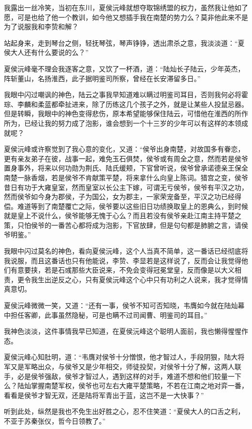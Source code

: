 我露出一丝冷笑，当初在东川，夏侯沅峰就想夺取锦绣盟的权力，虽然我让他如了愿，可是也给了他一个教训，如今他又想插手我在南楚的势力么？莫非他此来不是为了说服我和李贽和解？

站起身来，走到琴台之侧，轻抚琴弦，琴声铮铮，透出肃杀之意，我淡淡道：“夏侯大人还有什么要说的么？”

夏侯沅峰毫不理会我逐客之意，又饮了一杯酒，道：“陆灿长子陆云，少年英杰，阵斩董山，名扬淮西，此子据明鉴司所察，曾经在长安滞留多日。”

我眼中闪过嘲讽的神色，陆云之事我早知道难以瞒过明鉴司耳目，否则我何必将霍琮、李麟和柔蓝都牵扯进来，除了历练这几个孩子之外，就是让某些人投鼠忌器。但是转瞬，我眼中的神色变得悲伤，原本希望能够保住陆云，可惜他在淮西的所作所为，已经让我的努力成了泡影，谁会想到一个十三岁的少年可以有这样的本领成就呢？

夏侯沅峰或许察觉到了我心意的变化，又道：“侯爷出身南楚，对故国多有眷恋，更有亲友弟子在彼，战事一起，难免玉石俱焚，侯爷或有周全之意，然而若是侯爷置身事外，将来以何功勋为荆氏、陆氏缓颊，下官曾听说，侯爷曾承诺德亲王保全南楚一脉香烟，若是侯爷不肯献策平楚，将来拿什么向皇上陈词。猎宫之变，侯爷昔日有功于大雍皇室，然而皇室以长公主下嫁，可谓无亏侯爷，侯爷有平汉之功，然而侯爷如今身为郡侯，子为国公，女为郡主，一家荣宠备至，平汉之功已经得偿。难道等到了南楚覆亡之际，侯爷要以这些旧日功绩换取皇上的恩典么，到时候就是皇上不说什么，侯爷能够无愧于心么？而且若没有侯爷亲赴江南主持平楚之策，只怕侯爷的一番苦心都将成为泡影，下官放肆，但是句句都是肺腑之言，请侯爷明鉴。”

我眼中闪过莫名的神色，看向夏侯沅峰，这个人当真不简单，这一番话已经彻底将我说服，而且这番话也只有他能说，李贽、李显若是这样说了，反而会让我觉得他们有意要挟，若是石彧那些大臣说来，不免会变得冠冕堂皇，反而像是以大义相责，更令我生出逆反之心，只有夏侯沅峰这个心中只有功利之人说来，我才觉得情真意切。

夏侯沅峰微微一笑，又道：“还有一事，侯爷不知可否知晓，韦膺如今就在陆灿幕中担任客卿，此事虽然隐秘，可是也瞒不过司闻曹、明鉴司的耳目。”

我神色淡淡，这件事情我早已知道，在夏侯沅峰这个聪明人面前，我也懒得惺惺作态。

夏侯沅峰心知肚明，道：“韦膺对侯爷十分憎恨，他才智过人，手段阴狠，陆大将军又是军略出众，与侯爷又是少年相交，师徒投契，对侯爷十分了解，这两人联手，必是侯爷强敌，侯爷才智过人，遇到这样的对手，难道不想和他们较量一下么？陆灿掌握南楚军权，侯爷也可左右大雍平楚策略，不若在江南之地对弈一番，看看是侯爷才智无双，还是陆将军青出于蓝，这岂不是一大快事？”

听到此处，纵然是我也不免生出好胜之心，忍不住笑道：“夏侯大人的口舌之利，不亚于苏秦张仪，哲今日领教了。”

